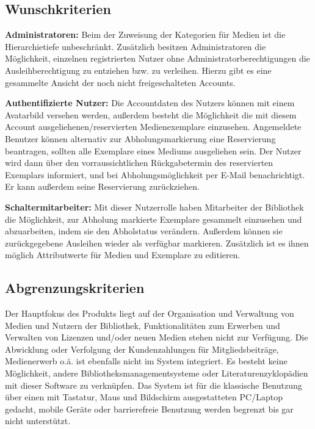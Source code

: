 \documentclass{article}
\begin{document}
\subsection{Wunschkriterien}

\begin{flushleft}
\textbf{Administratoren:} Beim der Zuweisung der Kategorien für Medien ist die Hierarchietiefe unbeschränkt. Zusätzlich besitzen Administratoren die Möglichkeit, einzelnen registrierten Nutzer ohne Administratorberechtigungen die Ausleihberechtigung zu entziehen bzw. zu verleihen. Hierzu gibt es eine gesammelte Ansicht der noch nicht freigeschalteten Accounts.
\end{flushleft}

\begin{flushleft}
\textbf{Authentifizierte Nutzer:} Die Accountdaten des Nutzers können mit einem Avatarbild versehen werden, außerdem besteht die Möglichkeit die mit diesem Account ausgeliehenen/reservierten Medienexemplare einzusehen. Angemeldete Benutzer können alternativ zur Abholungsmarkierung eine Reservierung beantragen, sollten alle Exemplare eines Mediums ausgeliehen sein. Der Nutzer wird dann über den vorraussichtlichen Rückgabetermin des reservierten Exemplars informiert, und bei Abholungsmöglichkeit per E-Mail benachrichtigt. Er kann außerdem seine Reservierung zurückziehen.
\end{flushleft}

\begin{flushleft}
\textbf{Schaltermitarbeiter:} Mit dieser Nutzerrolle haben Mitarbeiter der Bibliothek die Möglichkeit, zur Abholung markierte Exemplare gesammelt einzusehen und abzuarbeiten, indem sie den Abholstatus verändern. Außerdem können sie zurückgegebene Ausleihen wieder als verfügbar markieren. Zusätzlich ist es ihnen möglich Attributwerte für Medien und Exemplare zu editieren.
\end{flushleft}

\subsection{Abgrenzungskriterien}

Der Hauptfokus des Produkts liegt auf der Organisation und Verwaltung von Medien und Nutzern der Bibliothek, Funktionalitäten zum Erwerben und Verwalten von Lizenzen und/oder neuen Medien stehen nicht zur Verfügung. Die Abwicklung oder Verfolgung der Kundenzahlungen für Mitgliedsbeiträge, Medienerwerb o.ä. ist ebenfalls nicht im System integriert. Es besteht keine Möglichkeit, andere Bibliotheksmanagementsysteme oder Literaturenzyklopädien mit dieser Software zu verknüpfen. Das System ist für die klassische Benutzung über einen mit Tastatur, Maus und Bildschirm ausgestatteten PC/Laptop gedacht, mobile Geräte oder barrierefreie Benutzung werden begrenzt bis gar nicht unterstützt.
\end{document}
